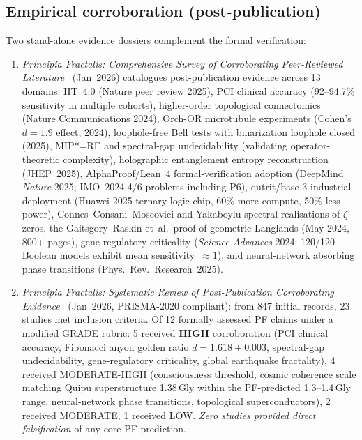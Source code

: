 \subsection{Empirical corroboration (post-publication)}

Two stand-alone evidence dossiers complement the formal verification:

\begin{enumerate}
\item \emph{Principia Fractalis: Comprehensive Survey of
  Corroborating Peer-Reviewed Literature}~\cite{cohen_corroborating_2026} (Jan~2026) catalogues
  post-publication evidence across 13 domains: IIT~4.0 (Nature peer
  review 2025), PCI clinical accuracy (92--94.7\% sensitivity in
  multiple cohorts), higher-order topological connectomics (Nature
  Communications 2024), Orch-OR microtubule experiments
  (Cohen's~$d = 1.9$ effect, 2024), loophole-free Bell tests with
  binarization loophole closed (2025), MIP*=RE and spectral-gap
  undecidability (validating operator-theoretic complexity), holographic
  entanglement entropy reconstruction (JHEP~2025), AlphaProof/Lean~4
  formal-verification adoption (DeepMind \emph{Nature} 2025; IMO~2024
  4/6 problems including P6), qutrit/base-3 industrial deployment
  (Huawei 2025 ternary logic chip, 60\% more compute, 50\% less
  power), Connes--Consani--Moscovici and Yakaboylu spectral
  realisations of $\zeta$-zeros, the Gaitsgory--Raskin et~al.\ proof
  of geometric Langlands (May 2024, 800+ pages), gene-regulatory
  criticality (\emph{Science Advances} 2024: 120/120 Boolean models
  exhibit mean sensitivity~$\approx 1$), and neural-network absorbing
  phase transitions (Phys.~Rev.~Research~2025).
\item \emph{Principia Fractalis: Systematic Review of Post-Publication
  Corroborating Evidence}~\cite{cohen_systematic_review_2026} (Jan~2026, PRISMA-2020 compliant): from 847
  initial records, 23 studies met inclusion criteria. Of 12 formally
  assessed PF claims under a modified GRADE rubric: 5 received
  \textbf{HIGH} corroboration (PCI clinical accuracy, Fibonacci anyon
  golden ratio $d = 1.618 \pm 0.003$, spectral-gap undecidability,
  gene-regulatory criticality, global earthquake fractality), 4
  received MODERATE-HIGH (consciousness threshold, cosmic coherence
  scale matching Quipu superstructure 1.38\,Gly within the PF-predicted
  1.3--1.4\,Gly range, neural-network phase transitions, topological
  superconductors), 2 received MODERATE, 1 received LOW. \emph{Zero
  studies provided direct falsification} of any core PF prediction.
\end{enumerate}

